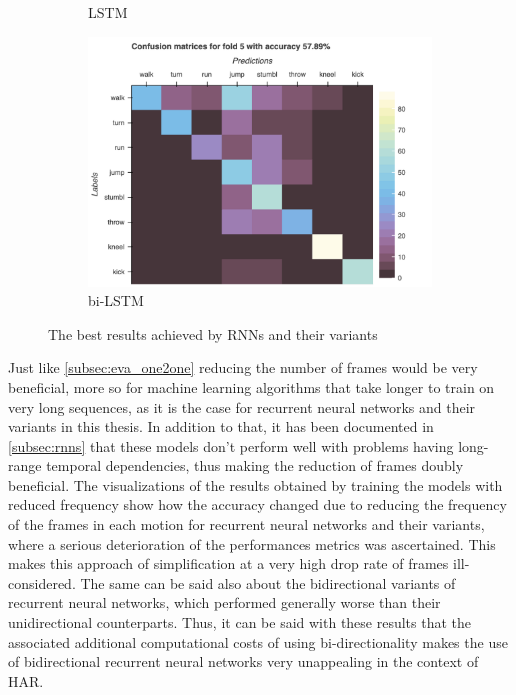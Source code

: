 \begin{figure}[H]
\begin{subfigure}[b]{0.49\textwidth}
				\caption{LSTM}
			\end{subfigure}
			\hfill
			\begin{subfigure}[b]{0.49\textwidth}
				\centering
				\includegraphics[width=\textwidth]{img/bi-LSTM-confusion_matrix.png}
				\caption{bi-LSTM}
			\end{subfigure}
			\caption{The best results achieved by RNNs and their variants}
			\label{fig:confusion-matrix-raw-seq}
		\end{figure}
		\newpage
		Just like \ref{subsec:eva_one2one} reducing the number of frames would be very beneficial, more so for machine learning algorithms that take longer to train on very long sequences, as it is the case for recurrent neural networks and their variants in this thesis. In addition to that, it has been documented in \ref{subsec:rnns} that these models don't perform well with problems having long-range temporal dependencies, thus making the reduction of frames doubly beneficial. The visualizations of the results obtained by training the models with reduced frequency show how the accuracy changed due to reducing the frequency of the frames in each motion for recurrent neural networks and their variants, where a serious deterioration of the performances metrics was ascertained. This makes this approach of simplification at a very high drop rate of frames ill-considered. The same can be said also about the bidirectional variants of recurrent neural networks, which performed generally worse than their unidirectional counterparts. Thus, it can be said with these results that the associated additional computational costs of using bi-directionality makes the use of bidirectional recurrent neural networks very unappealing in the context of HAR.
